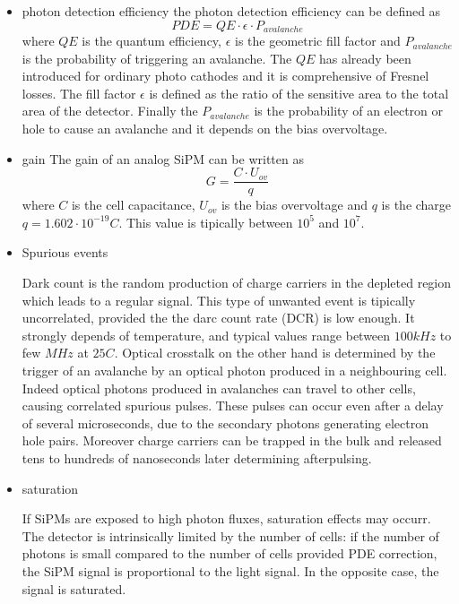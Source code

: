 \begin{itemize}
\item photon detection efficiency
the photon detection efficiency can be defined as
\begin{equation}
PDE = QE \cdot \epsilon \cdot P_{avalanche}
\end{equation}
where $QE$ is the quantum efficiency, $\epsilon$ is the geometric fill factor and $P_{avalanche}$ is the probability of triggering an avalanche.
The $QE$ has already been introduced for ordinary photo cathodes and it is comprehensive of Fresnel losses.
The fill factor $\epsilon$ is defined as the ratio of the sensitive area to the total area of the detector.
Finally the $P_{avalanche}$ is the probability of an electron or hole to cause an avalanche and it depends on the bias overvoltage.

\item gain
The gain of an analog SiPM can be written as
\begin{equation}
G = \frac{C\cdot U_{ov}}{q}
\end{equation}
where $C$ is the cell capacitance, $U_{ov}$ is the bias overvoltage and $q$ is the charge $q = 1.602 \cdot 10^{-19} C$.
This value is tipically between $10^{5}$ and $10^{7}$.

\item Spurious events

Dark count is the random production of charge carriers in the depleted region which leads to a regular signal. This type of unwanted event is tipically uncorrelated, provided the the darc count rate (DCR) is low enough. It strongly depends of temperature, and typical values range between $100kHz$ to few $MHz$ at $25C$.
Optical crosstalk on the other hand is determined by the trigger of an avalanche by an optical photon produced in a neighbouring cell. Indeed optical photons produced in avalanches can travel to other cells, causing correlated spurious pulses. These pulses can occur even after a delay of several microseconds, due to the secondary photons generating electron hole pairs.
Moreover charge carriers can be trapped in the bulk and released tens to hundreds of nanoseconds later determining afterpulsing.

\item saturation

If SiPMs are exposed to high photon fluxes, saturation effects may occurr. The detector is intrinsically limited by the number of cells: if the number of photons is small compared to the number of cells provided PDE correction, the SiPM signal is proportional to the light signal. In the opposite case, the signal is saturated.
\end{itemize}

